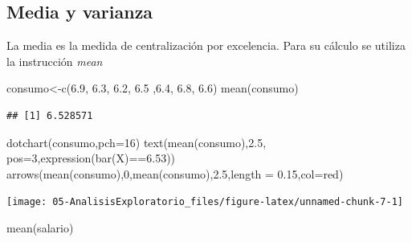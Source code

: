 \documentclass[
]{book}
\newenvironment{Shaded}{\begin{snugshade}}{\end{snugshade}}
\newcommand{\AttributeTok}[1]{\textcolor[rgb]{0.77,0.63,0.00}{#1}}
\newcommand{\DecValTok}[1]{\textcolor[rgb]{0.00,0.00,0.81}{#1}}
\newcommand{\FloatTok}[1]{\textcolor[rgb]{0.00,0.00,0.81}{#1}}
\newcommand{\FunctionTok}[1]{\textcolor[rgb]{0.00,0.00,0.00}{#1}}
\newcommand{\NormalTok}[1]{#1}
\newcommand{\OtherTok}[1]{\textcolor[rgb]{0.56,0.35,0.01}{#1}}
\newcommand{\SpecialCharTok}[1]{\textcolor[rgb]{0.00,0.00,0.00}{#1}}
\newcommand{\StringTok}[1]{\textcolor[rgb]{0.31,0.60,0.02}{#1}}
\theoremstyle{break}
\theoremstyle{nonumberplain}
\begin{document}
\hypertarget{media-y-varianza}{%
\subsection{Media y varianza}\label{media-y-varianza}}

La media es la medida de centralización por excelencia. Para su cálculo
se utiliza la instrucción \emph{mean}

\begin{Shaded}
\begin{Highlighting}[]
\NormalTok{consumo}\OtherTok{\textless{}{-}}\FunctionTok{c}\NormalTok{(}\FloatTok{6.9}\NormalTok{, }\FloatTok{6.3}\NormalTok{, }\FloatTok{6.2}\NormalTok{, }\FloatTok{6.5}\NormalTok{ ,}\FloatTok{6.4}\NormalTok{, }\FloatTok{6.8}\NormalTok{, }\FloatTok{6.6}\NormalTok{)}
\FunctionTok{mean}\NormalTok{(consumo)}
\end{Highlighting}
\end{Shaded}

\begin{verbatim}
## [1] 6.528571
\end{verbatim}

\begin{Shaded}
\begin{Highlighting}[]
\FunctionTok{dotchart}\NormalTok{(consumo,}\AttributeTok{pch=}\DecValTok{16}\NormalTok{)}
\FunctionTok{text}\NormalTok{(}\FunctionTok{mean}\NormalTok{(consumo),}\FloatTok{2.5}\NormalTok{, }\AttributeTok{pos=}\DecValTok{3}\NormalTok{,}\FunctionTok{expression}\NormalTok{(}\FunctionTok{bar}\NormalTok{(X)}\SpecialCharTok{==}\FloatTok{6.53}\NormalTok{))}
\FunctionTok{arrows}\NormalTok{(}\FunctionTok{mean}\NormalTok{(consumo),}\DecValTok{0}\NormalTok{,}\FunctionTok{mean}\NormalTok{(consumo),}\FloatTok{2.5}\NormalTok{,}\AttributeTok{length =} \FloatTok{0.15}\NormalTok{,}\AttributeTok{col=}\StringTok{\textquotesingle{}red\textquotesingle{}}\NormalTok{)}
\end{Highlighting}
\end{Shaded}

\begin{center}\texttt{[image: 05-AnalisisExploratorio\_files/figure-latex/unnamed-chunk-7-1]} \end{center}

\begin{Shaded}
\begin{Highlighting}[]
\FunctionTok{mean}\NormalTok{(salario)}
\end{Highlighting}
\end{Shaded}
\end{document}
